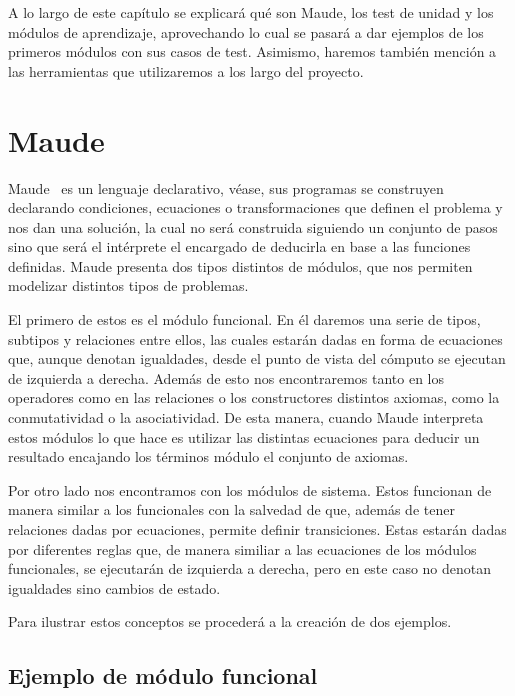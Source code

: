 
A lo largo de este capítulo se explicará qué son Maude, los test de unidad y los módulos de aprendizaje, aprovechando lo cual se pasará a dar ejemplos de los primeros módulos con sus casos de test. Asimismo, haremos también mención a las herramientas que utilizaremos a los largo del proyecto.\par

\section{Maude}

Maude~\cite{maudeBook} es un lenguaje declarativo, véase, sus programas se construyen declarando condiciones, ecuaciones o transformaciones que definen el problema y nos dan una solución, la cual no será construida siguiendo un conjunto de pasos sino que será el intérprete el encargado de deducirla en base a las funciones definidas. Maude presenta dos tipos distintos de módulos, que nos permiten modelizar distintos tipos de problemas.\par

El primero de estos es el módulo funcional. En él daremos una serie de tipos, subtipos y relaciones entre ellos, las cuales estarán dadas en forma de ecuaciones que, aunque denotan igualdades, desde el punto de vista del cómputo se ejecutan de izquierda a derecha. Además de esto nos encontraremos tanto en los operadores como en las relaciones o los constructores distintos axiomas, como la conmutatividad o la asociatividad. De esta manera, cuando Maude interpreta estos módulos lo que hace es utilizar las distintas ecuaciones para deducir un resultado encajando los términos módulo el conjunto de axiomas.\par

Por otro lado nos encontramos con los módulos de sistema. Estos funcionan de manera similar a los funcionales con la salvedad de que, además de tener relaciones dadas por ecuaciones, permite definir transiciones. Estas estarán dadas por diferentes reglas que, de manera similiar a las ecuaciones de los módulos funcionales, se ejecutarán de izquierda a derecha, pero en este caso no denotan igualdades sino cambios de estado.\par

Para ilustrar estos conceptos se procederá a la creación de dos ejemplos. \par

\subsection{Ejemplo de módulo funcional}

